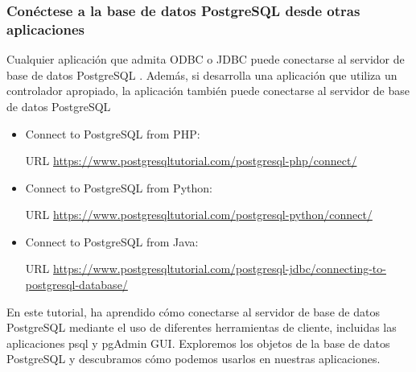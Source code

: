 \documentclass[10pt]{article}
\newcommand{\enlaces}[1]{{\textcolor{G}{URL} #1}}
\newcommand{\postgres}[1]{{\textcolor{R}{PostgreSQL} #1}}
\newcommand{\psql}[1]{{\textcolor{B}{psql} #1}}
\newcommand{\pgAdmin}[1]{{\textcolor{B}{pgAdmin} #1}}
\begin{document}
\subsubsection{Conéctese a la base de datos \postgres{} desde otras aplicaciones}


Cualquier aplicación que admita ODBC o JDBC puede conectarse al servidor de base de datos \postgres{}. Además, si desarrolla una aplicación que utiliza un controlador apropiado, la aplicación también puede conectarse al servidor de base de datos \postgres{}

\begin{itemize}
\item Connect to PostgreSQL from PHP: 

\enlaces{} \url{https://www.postgresqltutorial.com/postgresql-php/connect/}
\item Connect to PostgreSQL from Python:

\enlaces{} \url{https://www.postgresqltutorial.com/postgresql-python/connect/}
\item Connect to PostgreSQL from Java:

\enlaces{} \url{https://www.postgresqltutorial.com/postgresql-jdbc/connecting-to-postgresql-database/}
\end{itemize}

En este tutorial, ha aprendido cómo conectarse al servidor de base de datos \postgres{}  mediante el uso de diferentes herramientas de cliente, incluidas las aplicaciones \psql{} y \pgAdmin{} GUI. Exploremos los objetos de la base de datos \postgres{} y descubramos cómo podemos usarlos en nuestras aplicaciones.
\end{document}
